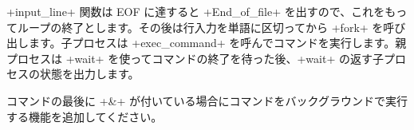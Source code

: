 \ml+input_line+ 関数は EOF に達すると \ml+End_of_file+ を出すので、これをもってループの終了とします。その後は行入力を単語に区切ってから \ml+fork+ を呼び出します。子プロセスは \ml+exec_command+ を呼んでコマンドを実行します。親プロセスは \ml+wait+ を使ってコマンドの終了を待った後、\ml+wait+ の返す子プロセスの状態を出力します。

\begin{exercise}
\label{shell}
コマンドの最後に \ml+&+ が付いている場合にコマンドをバックグラウンドで実行する機能を追加してください。
\end{exercise}

